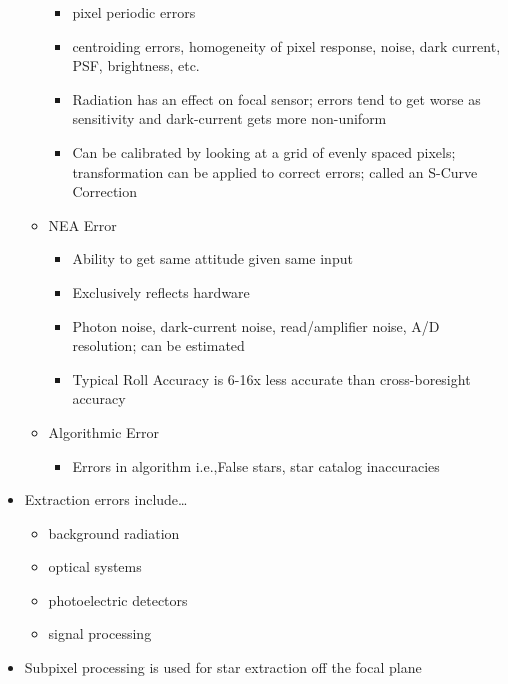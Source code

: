 \begin{itemize}
\begin{itemize}
        \begin{itemize}
            \item pixel periodic errors
            \item centroiding errors, homogeneity of pixel response, noise, dark current, PSF, brightness, etc.
            \item Radiation has an effect on focal sensor; errors tend to get worse as sensitivity and dark-current gets more non-uniform
            \item Can be calibrated by looking at a grid of evenly spaced pixels; transformation can be applied to correct errors; called an S-Curve Correction
        \end{itemize} 
    \end{itemize}
    \begin{itemize}
        \item NEA Error 
        \begin{itemize}
            \item Ability to get same attitude given same input
            \item Exclusively reflects hardware
            \item Photon noise, dark-current noise, read/amplifier noise, A/D resolution; can be estimated
            \item Typical Roll Accuracy is 6-16x less accurate than cross-boresight accuracy
        \end{itemize}
    \end{itemize}
    \begin{itemize}
        \item Algorithmic Error
        \begin{itemize}
            \item Errors in algorithm i.e.,False stars, star catalog inaccuracies
        \end{itemize}
    \end{itemize}
    \item Extraction errors include\dots
    \begin{itemize}
        \item background radiation
        \item optical systems
        \item photoelectric detectors
        \item signal processing
    \end{itemize}
    \item Subpixel processing is used for star extraction off the focal plane
\end{itemize}
